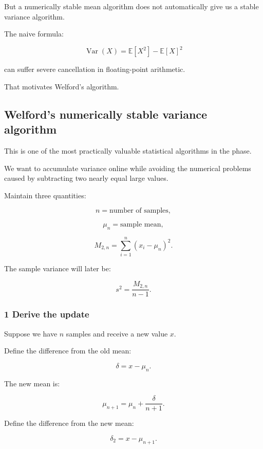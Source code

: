 But a numerically stable mean algorithm does not automatically give us a stable variance algorithm.

The naive formula:

\[
 \operatorname{Var}(X)= \mathbb E[X^2]-\mathbb E[X]^2
\]

can suffer severe cancellation in floating-point arithmetic.

That motivates Welford's algorithm.

\subsection{Welford's numerically stable variance algorithm}\label{02-foundations-ii-ch030-welfords-numerically-stable-variance-algorithm}

\hypertarget{02-foundations-ii-ch030-welfords-numerically-stable-variance-algorithm}{}

This is one of the most practically valuable statistical algorithms in the phase.

We want to accumulate variance online while avoiding the numerical problems caused by subtracting two nearly equal large values.

Maintain three quantities:

\[
 n=\text{number of samples},
\]

\[
 \mu_n=\text{sample mean},
\]

\[
 M_{2,n}= \sum_{i=1}^{n}(x_i-\mu_n)^2.
\]

The sample variance will later be:

\[
 s^2=\frac{M_{2,n}}{n-1}.
\]

\subsubsection{1 Derive the update}\label{02-foundations-ii-ch030-derive-the-update}

\hypertarget{02-foundations-ii-ch030-derive-the-update}{}

Suppose we have \(n\) samples and receive a new value \(x\).

Define the difference from the old mean:

\[
 \boxed{\delta=x-\mu_n}.
\]

The new mean is:

\[
 \boxed{ \mu_{n+1} = \mu_n+\frac{\delta}{n+1} }.
\]

Define the difference from the new mean:

\[
 \boxed{ \delta_2=x-\mu_{n+1} }.
\]

